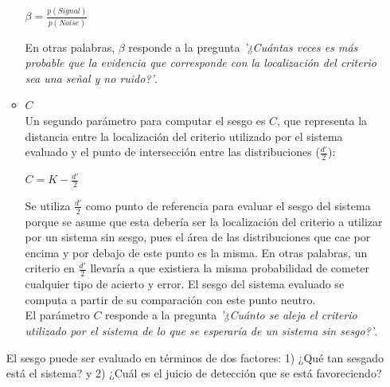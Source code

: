 \begin{itemize}
\begin{itemize}
\begin{center}
$\beta = \frac{p(Signal)}{p(Noise)}$ \\
\end{center}

En otras palabras, $\beta$ responde a la pregunta \textit{'¿Cuántas veces es más probable que la evidencia que corresponde con la localización del criterio sea una señal y no ruido?'}.

\item \underline{$C$}\\

Un segundo parámetro para computar el sesgo es $C$, que representa la distancia entre la localización del criterio utilizado por el sistema evaluado y el punto de intersección entre las distribuciones ($\frac{d'}{2}$):\\

\begin{center}
$C =  K - \frac{d'}{2}$ \\
\end{center}

Se utiliza $\frac{d'}{2}$ como punto de referencia para evaluar el sesgo del sistema porque se asume que esta debería ser la localización del criterio a utilizar por un sistema sin sesgo, pues el área de las distribuciones que cae por encima y por debajo de este punto es la misma. En otras palabras, un criterio en $\frac{d'}{2}$ llevaría a que existiera la misma probabilidad de cometer cualquier tipo de acierto y error. El sesgo del sistema evaluado se computa a partir de su comparación con este punto neutro.\\

El parámetro $C$ responde a la pregunta \textit{'¿Cuánto se aleja el criterio utilizado por el sistema de lo que se esperaría de un sistema sin sesgo?'}.\\

\end{itemize}

El sesgo puede ser evaluado en términos de dos factores: 1) ¿Qué tan sesgado está el sistema? y 2) ¿Cuál es el juicio de detección que se está favoreciendo?\\


\end{itemize}
